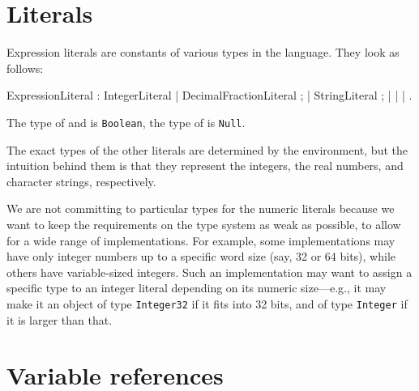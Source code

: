 \section{Literals}\label{sect:Literals}
 

 Expression literals are
constants of various types in the language. They look as follows:


\bgr
ExpressionLiteral : IntegerLiteral | DecimalFractionLiteral ;
       | StringLiteral ;
       | \kwTrue | \kwFalse | \kwNull.
\egr

The type of \kwTrue and \kwFalse is {\tt Boolean}, the type of \kwNull
is {\tt Null}. 


The exact types of the
other literals are determined by the environment, but the intuition
behind them is that they represent the integers, the real numbers, and
character strings, respectively.

\begin{rationale}
  We are not committing to particular types for the numeric
  literals because we want to keep the requirements on the type system
  as weak as possible, to allow for a wide range of implementations. For
  example, some implementations may have only integer numbers up to a
  specific word size (say, 32 or 64 bits), while others have
  variable-sized integers. Such an implementation may want to assign a
  specific type to an integer literal depending on its numeric
  size---e.g., it may make it an object of type {\tt Integer32} if it
  fits into 32 bits, and of type {\tt Integer} if it is larger than that.
\end{rationale}


\section{Variable references}\label{sect:VariableRefs}

